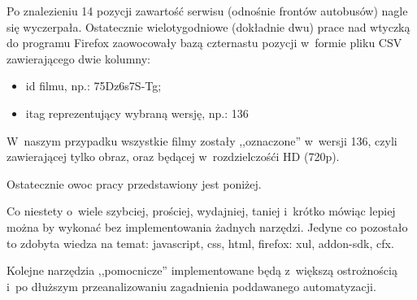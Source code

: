 Po znalezieniu 14 pozycji zawartość serwisu (odnośnie frontów autobusów) nagle się
wyczerpała. Ostatecznie wielotygodniowe (dokładnie dwu) prace nad wtyczką do programu 
Firefox zaowocowały bazą czternastu pozycji w~formie pliku CSV zawierającego dwie
kolumny:

\begin{itemize}
    \item id filmu, np.: 75Dz6s7S-Tg;
    \item itag reprezentujący wybraną wersję, np.: 136
\end{itemize}

W~naszym przypadku wszystkie filmy zostały ,,oznaczone'' w~wersji 136, czyli
zawierającej tylko obraz, oraz będącej w~rozdzielczośći HD (720p).

Ostatecznie owoc pracy przedstawiony jest poniżej.



Co niestety o~wiele szybciej, prościej, wydajniej, taniej i~krótko mówiąc lepiej można
by wykonać bez implementowania żadnych narzędzi. Jedyne co pozostało to zdobyta wiedza
na temat: javascript, css, html, firefox: xul, addon-sdk, cfx. 

Kolejne narzędzia ,,pomocnicze'' implementowane będą z~większą ostrożnością i~po
dłuższym przeanalizowaniu zagadnienia poddawanego automatyzacji.


